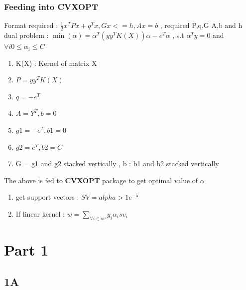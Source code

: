 \documentclass[12pt,t]{beamer}
\begin{document}
\begin{frame}
    \frametitle{Feeding into CVXOPT }
    \scriptsize

    \centering Format required : $\frac{1}{2} x^T P x + q^T x , G x <= h ,  Ax = b$ , required P,q,G A,b and h
    \\ 



    \centering dual problem : $\min(\alpha)  =  \alpha^T  (yy^T K(X))  \alpha - e^T  \alpha$ , 
                    s.t $\alpha^T y =0 $ and $\forall i 0 \leq \alpha_i \leq C$
    \\

    \begin{enumerate}
        \item K(X) : Kernel of matrix X

        \item $P = yy^T K(X)$
        \item $q = - e^T$
        \item $A =Y^T , b=0$
        \item $g1  = -e^T , b1 = 0$
        \item $g2 = e^T , b2 = C$
        \item G = g1 and g2 stacked vertically , b : b1 and b2 stacked vertically
        
    \end{enumerate}

    The above is fed to \textbf{CVXOPT} package to get optimal value of $\alpha$

    \begin{enumerate}
        \item get support vectors : $SV = alpha > 1e^{-5}$
        \item If linear kernel : $w = \sum_{\forall i \in sv}{y_i \alpha_i sv_i}$
    
    \end{enumerate}
    

    

\end{frame}

\section{Part 1}



\subsection{1A}
\end{document}
